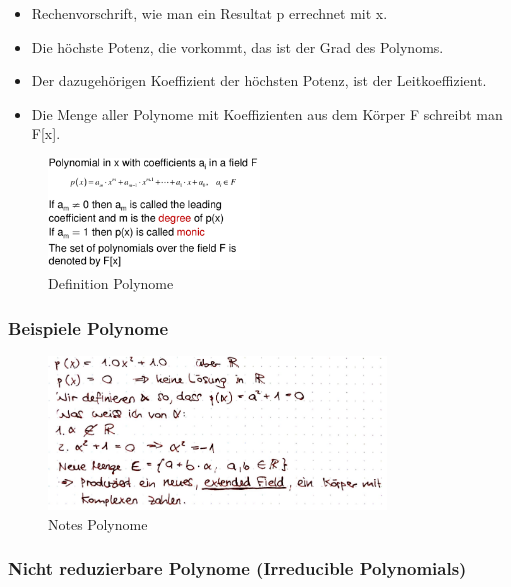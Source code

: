 \begin{itemize}
\tightlist
\item
  Rechenvorschrift, wie man ein Resultat p errechnet mit x.
\item
  Die höchste Potenz, die vorkommt, das ist der Grad des Polynoms.
\item
  Der dazugehörigen Koeffizient der höchsten Potenz, ist der
  Leitkoeffizient.
\item
  Die Menge aller Polynome mit Koeffizienten aus dem Körper F schreibt
  man F{[}x{]}.
\end{itemize}

\begin{figure}[H]
\centering
\includegraphics[width=0.5\textwidth]{figures/polynomials.png}
\caption{Definition Polynome}
\end{figure}

\hypertarget{beispiele-polynome}{%
\subsubsection{Beispiele Polynome}\label{beispiel-2}}

\begin{figure}[H]
\centering
\includegraphics[width=0.8\textwidth]{figures/notesPolynome.png}
\caption{Notes Polynome}
\end{figure}

\hypertarget{nicht-reduzierbare-polynome-irreducible-polynomials}{%
\subsubsection{Nicht reduzierbare Polynome (Irreducible
Polynomials)}\label{nicht-reduzierbare-polynome-irreducible-polynomials}}

